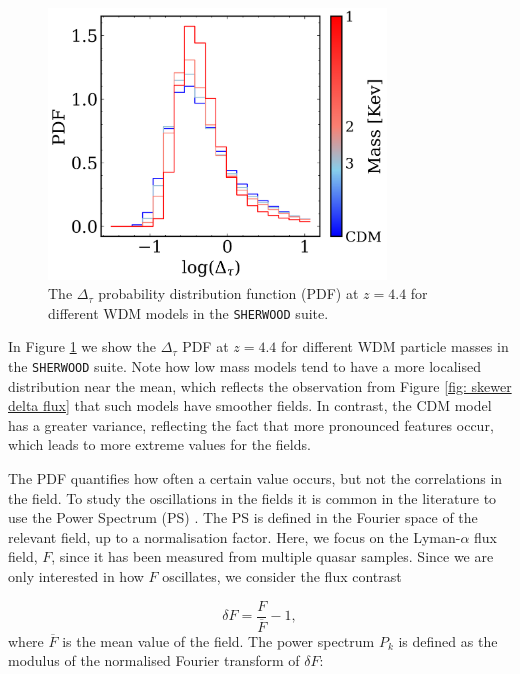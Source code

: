 \begin{figure}[ht]
        \centering
            \includegraphics[width=0.8\textwidth]{img/ML/pdf_density_sherwood.png}
            \caption{The $\Delta_\tau$ probability distribution function (PDF) at $z=4.4$ for different WDM models in the \texttt{SHERWOOD} suite.}
            \label{fig: exact density PDF}
\end{figure}


In Figure \ref{fig: exact density PDF} we show the $\Delta_\tau$ PDF at $z=4.4$ for different WDM particle masses in the \texttt{SHERWOOD} suite. Note how low mass models tend to have a more localised distribution near the mean, which reflects the observation from Figure \ref{fig: skewer delta flux} that such models have smoother fields. In contrast, the CDM model has a greater variance, reflecting the fact that more pronounced features occur, which leads to more extreme values for the fields. 

The PDF quantifies how often a certain value occurs, but not the correlations in the field. To study the oscillations in the fields it is common in the literature to use the Power Spectrum (PS) \cite{McDonald_2006,Ravoux_2023}. The PS is defined in the Fourier space of the relevant field, up to a normalisation factor. Here, we focus on the Lyman-$\alpha$ flux field, $F$, since it has been measured from multiple quasar samples. Since we are only interested in how $F$ oscillates, we consider the flux contrast

\begin{equation}\label{eq: flux contrast}
        \delta F=\frac{F}{\overline{F}} -1,
\end{equation}
where $\overline{F}$ is the mean value of the field. The power spectrum $P_k$ is defined as the modulus of the normalised Fourier transform of $\delta F$:

